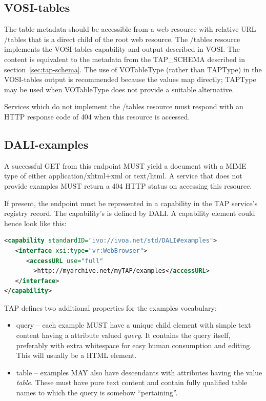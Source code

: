 \documentclass[11pt,letter]{ivoa}
\newcommand{\tapschema}{TAP\_SCHE\-MA}
\newcommand{\tapschema}{\mbox{%
  \relsize{-0.5}TAP\discretionary{-}{}{\kern-2pt\_}SCHEMA}}
\begin{document}
\subsection{VOSI-tables}
\label{sec:vosi-tables}

The table metadata should be accessible from a web resource with relative URL 
/tables that is a direct child of the root web resource. The /tables resource 
implements the VOSI-tables capability and output described in VOSI.
The content is equivalent to the metadata from the 
\tapschema{} described in section~\ref{sec:tap-schema}. The use of VOTableType 
(rather than TAPType) in the VOSI-tables output  is recommended because the values 
map directly; TAPType may be used when VOTableType does not provide a suitable
alternative.

Services which do not implement the /tables resource must respond with an HTTP 
response code of 404 when this resource is accessed.

\subsection{DALI-examples}
\label{sec:dali-examples}

A successful GET from this endpoint MUST yield a document with a MIME type of either 
application/xhtml+xml or text/html. A service that does not provide examples 
MUST return a 404 HTTP status on accessing this resource.

If present, the endpoint must be represented in a capability in the TAP 
service's registry record. The capability's  is defined by
DALI. A capability element could hence look like this:

\begin{lstlisting}[language=XML,basicstyle=\footnotesize]
<capability standardID="ivo://ivoa.net/std/DALI#examples">
   <interface xsi:type="vr:WebBrowser">
      <accessURL use="full"
        >http://myarchive.net/myTAP/examples</accessURL>
   </interface>
</capability>
\end{lstlisting}

TAP defines two additional properties for the examples vocabulary:

\begin{itemize}
\item query -- each example MUST have a unique child element with simple text 
content having a  attribute valued {\em query}. It contains the query itself, 
preferably with extra whitespace for easy human consumption and editing. This 
will usually be a HTML  element.
    
\item table -- examples MAY also have descendants with  attributes having 
the value {\em table}. These must have pure text content and contain fully qualified 
table names to which the query is somehow ``pertaining''.
\end{itemize}
\end{document}
